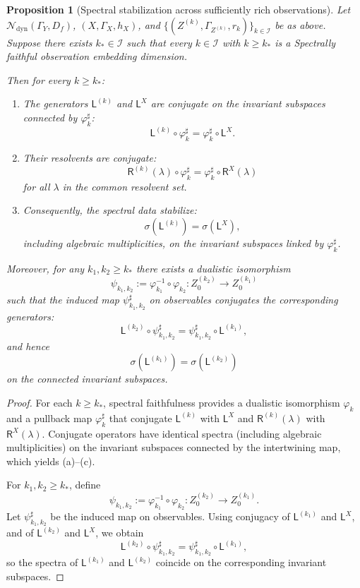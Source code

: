 \documentclass[11pt]{article}
\newtheorem{proposition}{Proposition}
\begin{document}
\begin{proposition}[Spectral stabilization across sufficiently rich observations]
\label{prop:spectral-stabilization-observation}
Let $\mathcal N_{\mathrm{dyn}}(\Gamma_Y,D_f)$,
$(X,\Gamma_X,h_X)$, and $\{(Z^{(k)},\Gamma_{Z^{(k)}},r_k)\}_{k\in\mathcal I}$
be as above. Suppose there exists $k_\ast\in\mathcal I$ such that every
$k\in\mathcal I$ with $k\ge k_\ast$ is a Spectrally faithful observation
embedding dimension.

Then for every $k\ge k_\ast$:
\begin{enumerate}[label=(\alph*),leftmargin=1.8em]
  \item The generators $\mathsf L^{(k)}$ and $\mathsf L^X$ are conjugate
  on the invariant subspaces connected by $\varphi_k^\sharp$:
  \[
    \mathsf L^{(k)} \circ \varphi_k^\sharp
    = \varphi_k^\sharp \circ \mathsf L^X.
  \]
  \item Their resolvents are conjugate:
  \[
    \mathsf R^{(k)}(\lambda) \circ \varphi_k^\sharp
    = \varphi_k^\sharp \circ \mathsf R^X(\lambda)
  \]
  for all $\lambda$ in the common resolvent set.
  \item Consequently, the spectral data stabilize:
  \[
    \sigma(\mathsf L^{(k)}) = \sigma(\mathsf L^X),
  \]
  including algebraic multiplicities, on the invariant subspaces linked
  by $\varphi_k^\sharp$.
\end{enumerate}
Moreover, for any $k_1,k_2\ge k_\ast$ there exists a dualistic
isomorphism
\[
  \psi_{k_1,k_2}
  := \varphi_{k_1}^{-1}\circ\varphi_{k_2}
  : Z^{(k_2)}_0 \to Z^{(k_1)}_0
\]
such that the induced map $\psi_{k_1,k_2}^\sharp$ on observables
conjugates the corresponding generators:
\[
  \mathsf L^{(k_2)} \circ \psi_{k_1,k_2}^\sharp
  = \psi_{k_1,k_2}^\sharp \circ \mathsf L^{(k_1)},
\]
and hence
\[
  \sigma(\mathsf L^{(k_1)}) = \sigma(\mathsf L^{(k_2)})
\]
on the connected invariant subspaces.
\end{proposition}

\begin{proof}
For each $k\ge k_\ast$, spectral faithfulness provides a dualistic
isomorphism $\varphi_k$ and a pullback map $\varphi_k^\sharp$ that
conjugate $\mathsf L^{(k)}$ with $\mathsf L^X$ and
$\mathsf R^{(k)}(\lambda)$ with $\mathsf R^X(\lambda)$. Conjugate
operators have identical spectra (including algebraic multiplicities) on
the invariant subspaces connected by the intertwining map, which yields
(a)--(c).

For $k_1,k_2\ge k_\ast$, define
\[
  \psi_{k_1,k_2}
  := \varphi_{k_1}^{-1}\circ\varphi_{k_2}
  : Z^{(k_2)}_0 \to Z^{(k_1)}_0.
\]
Let $\psi_{k_1,k_2}^\sharp$ be the induced map on observables. Using
conjugacy of $\mathsf L^{(k_1)}$ and $\mathsf L^X$, and of
$\mathsf L^{(k_2)}$ and $\mathsf L^X$, we obtain
\[
  \mathsf L^{(k_2)} \circ \psi_{k_1,k_2}^\sharp
  = \psi_{k_1,k_2}^\sharp \circ \mathsf L^{(k_1)},
\]
so the spectra of $\mathsf L^{(k_1)}$ and $\mathsf L^{(k_2)}$ coincide
on the corresponding invariant subspaces.
\end{proof}
\end{document}
